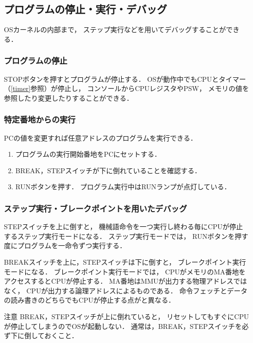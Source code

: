 \subsection{プログラムの停止・実行・デバッグ}
OSカーネルの内部まで，
ステップ実行などを用いてデバッグすることができる．

\subsubsection{プログラムの停止}
STOPボタンを押すとプログラムが停止する．
OSが動作中でもCPUとタイマー（\ref{timer}参照）が停止し，
コンソールからCPUレジスタやPSW，
メモリの値を参照したり変更したりすることができる．

\subsubsection{特定番地からの実行}
PCの値を変更すれば任意アドレスのプログラムを実行できる．

\begin{enumerate}
\item プログラムの実行開始番地をPCにセットする．
\item BREAK，STEPスイッチが下に倒れていることを確認する．
\item RUNボタンを押す．
  プログラム実行中はRUNランプが点灯している．
\end{enumerate}

\subsubsection{ステップ実行・ブレークポイントを用いたデバッグ}
STEPスイッチを上に倒すと，
機械語命令を一つ実行し終わる毎にCPUが停止するステップ実行モードになる．
ステップ実行モードでは，
RUNボタンを押す度にプログラムを一命令ずつ実行する．

BREAKスイッチを上に，STEPスイッチは下に倒すと，
ブレークポイント実行モードになる．
ブレークポイント実行モードでは，
CPUがメモリのMA番地をアクセスするとCPUが停止する．
MA番地はMMUが出力する物理アドレスではなく，
CPUが出力する論理アドレスによるものである．
命令フェッチとデータの読み書きのどちらでもCPUが停止する点が{\tec}と異なる．

\begin{itembox}[l]{注意}
  BREAK，STEPスイッチが上に倒れていると，
  リセットしてもすぐにCPUが停止してしまうのでOSが起動しない．
  通常は，BREAK，STEPスイッチを必ず下に倒しておくこと．
\end{itembox}

